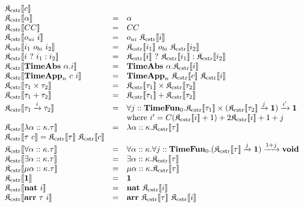 \documentclass[fleqn]{article}
\begin{document}
\[
\begin{array}{lcl}
    \cpsc{c} \\
    \cpsc{\alpha} & = & \alpha \\
    \cpsc{CC} & = & CC \\
    \cpsc{o_{ui}~i} & = & o_{ui}~\cpsc{i} \\
    \cpsc{i_1~o_{bi}~i_2} & = & \cpsc{i_1}~o_{bi}~\cpsc{i_2} \\
    \cpsc{i~?~i_1 : i_2} & = & \cpsc{i}~?~\cpsc{i_1} : \cpsc{i_2} \\
    \cpsc{\mathbf{TimeAbs}~\alpha.i} & = & \mathbf{TimeAbs}~\alpha.\cpsc{i} \\
    \cpsc{\mathbf{TimeApp}_n~c~i} & = & \mathbf{TimeApp}_n~\cpsc{c}~\cpsc{i} \\
    \cpsc{\tau_1 \times \tau_2} & = & \cpsc{\tau_1} \times \cpsc{\tau_2} \\
    \cpsc{\tau_1 + \tau_2} & = & \cpsc{\tau_1} + \cpsc{\tau_2} \\
    \cpsc{\tau_1 \xrightarrow{i} \tau_2} & = & \forall j :: \mathbf{TimeFun}_0. \cpsc{\tau_1} \times (\cpsc{\tau_2} \xrightarrow{j} \mathbf{1}) \xrightarrow{i'} \mathbf{1} \\
    & & \mathrm{where}~i'= C(\cpsc{i}+1) + 2\cpsc{i} + 1 + j \\
    \cpsc{\lambda \alpha :: \kappa. \tau} & = & \lambda \alpha :: \kappa. \cpsc{\tau} \\
    \cpsc{\tau~c} = \cpsc{\tau}~\cpsc{c} \\
    \cpsc{\forall \alpha :: \kappa. \tau} & = & \forall \alpha :: \kappa. \forall j :: \mathbf{TimeFun}_0. (\cpsc{\tau} \xrightarrow{j} \mathbf{1}) \xrightarrow{1 + j} \mathbf{void} \\
    \cpsc{\exists \alpha :: \kappa. \tau} & = & \exists \alpha :: \kappa. \cpsc{\tau} \\
    \cpsc{\mu \alpha :: \kappa. \tau} & = & \mu \alpha :: \kappa. \cpsc{\tau} \\
    \cpsc{\mathbf{1}} & = & \mathbf{1} \\
    \cpsc{\mathbf{nat}~i} & = & \mathbf{nat}~\cpsc{i} \\
    \cpsc{\mathbf{arr}~\tau~i} & = & \mathbf{arr}~\cpsc{\tau}~\cpsc{i}
\end{array}
\]
\end{document}
